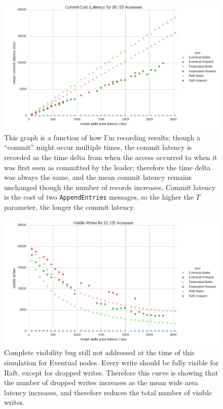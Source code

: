 \documentclass[11pt,letterpaper]{article}
\begin{document}
\begin{figure}[!h]
    \centering
        \includegraphics[width=\textwidth]{figures/commit_latency.png}
        \caption{\textsf{This graph is a function of how I'm recording results; though a ``commit'' might occur multiple times, the commit latency is recorded as the time delta from when the access occurred to when it was first seen as committed by the leader; therefore the time delta was always the same, and the mean commit latency remains unchanged though the number of records increases. Commit latency is the cost of two \texttt{AppendEntries} messages, so the higher the $T$ parameter, the longer the commit latency.}}
        \label{fig:commit_latency}
\end{figure}

\begin{figure}[!h]
    \centering
        \includegraphics[width=\textwidth]{figures/visible_writes.png}
        \caption{\textsf{Complete visibility bug still not addressed at the time of this simulation for Eventual nodes. Every write should be fully visible for Raft, except for dropped writes. Therefore this curve is showing that the number of dropped writes increases as the mean wide area latency increases, and therefore reduces the total number of visible writes. }}
        \label{fig:visible_writes}
\end{figure}
\end{document}
